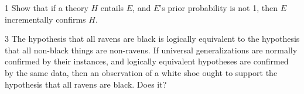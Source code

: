 
\begin{exercise}{1}
  Show that if a theory $H$ entails $E$, and $E$'s prior probability is not
  1, then $E$ incrementally confirms $H$.
\end{exercise}

\begin{exercise}{3}
  The hypothesis that all ravens are black is logically equivalent to the
  hypothesis that all non-black things are non-ravens. If universal
  generalizations are normally confirmed by their instances, and logically
  equivalent hypotheses are confirmed by the same data, then an observation of a
  white shoe ought to support the hypothesis that all ravens are black. Does
  it?
\end{exercise}



